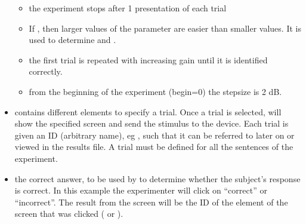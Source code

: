 \begin{itemize}
\begin{itemize}
\item {} the experiment stops after 1
presentation of each trial

\item {} If , then larger values
of the parameter are easier than smaller values. It is used to
determine  and .

\item {} the first trial is
repeated with increasing gain until it is identified correctly.

\item {} from the beginning of the experiment
(begin=0) the stepsize is 2 dB.
\end{itemize}

\item {} contains different  elements
to specify a trial. Once a trial is selected, 
will show the specified screen and send the stimulus to the
device. Each trial is given an ID (arbitrary name), eg
, such that it can be referred to later on or
viewed in the results file. A trial must be defined for all the
sentences of the experiment.

\item {} the correct answer, to be used by \apex to
determine whether the subject's response is correct. In this
example the experimenter will click on ``correct'' or
``incorrect''. The result from the screen will be the ID of the
element of the screen that was clicked ( or
).

\end{itemize}















